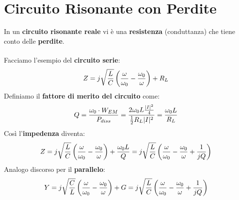 \section{Circuito Risonante con Perdite}
In un \textbf{circuito risonante reale} vi è una \textbf{resistenza} (conduttanza) che tiene conto delle \textbf{perdite}.\\ \\
Facciamo l'esempio del \textbf{circuito serie}:
\begin{equation*}
    Z =  j \sqrt{\frac{L}{C}} \left(\frac{\omega}{\omega_0}- \frac{\omega_0}{\omega}\right) + R_L
\end{equation*}
Definiamo il \textbf{fattore di merito del circuito} come:
\begin{equation*}
    Q = \frac{\omega_0 \cdot W_{EM}}{P_{diss}} = \frac{2 \omega_0 L \frac{|I|^2}{4}}{\frac{1}{2} R_L |I|^2} = \frac{\omega_0 L}{R_L}
\end{equation*}
Così l'\textbf{impedenza} diventa:
\begin{equation*}
    Z = j \sqrt{\frac{L}{C}} \left(\frac{\omega}{\omega_0} - \frac{\omega_0}{\omega}\right) + \frac{\omega_0 L}{Q} = j \sqrt{\frac{L}{C}} \left(\frac{\omega}{\omega_0} - \frac{\omega_0}{\omega} + \frac{1}{j Q}\right)
\end{equation*}
Analogo discorso per il \textbf{parallelo}:
\begin{equation*}
    Y = j \sqrt{\frac{C}{L}} \left(\frac{\omega}{\omega_0} - \frac{\omega_0}{\omega}\right) + G = j \sqrt{\frac{L}{C}} \left(\frac{\omega}{\omega_0} - \frac{\omega_0}{\omega} + \frac{1}{j Q}\right)
\end{equation*}

